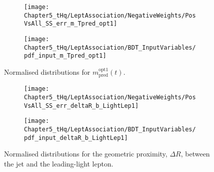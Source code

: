 \begin{comment}
\begin{figure}[h]
\centering
\begin{subfigure}{.46\textwidth}
  \centering
  \texttt{[image: Chapter5\_tHq/LeptAssociation/NegativeWeights/PosVsAll\_SS\_err\_deltaEta\_tau\_LightLep2\_fixed]}
\end{subfigure}%
\begin{subfigure}{.46\textwidth}
  \centering
  \texttt{[image: Chapter5\_tHq/LeptAssociation/BDT\_InputVariables/pdf\_input\_deltaEta\_tau\_LightLep2]}
\end{subfigure}
\caption{Normalised distributions for $\Delta \eta(\tauhad, \ell_{2})$.}
\label{fig:Appendix:BDTVARS:LeptonAssignment:deltaEta_tau_LightLep2}
\end{figure}
\end{comment}

\begin{figure}[h]
\centering
\begin{subfigure}{.46\textwidth}
  \centering
  \texttt{[image: Chapter5\_tHq/LeptAssociation/NegativeWeights/PosVsAll\_SS\_err\_m\_Tpred\_opt1]}
\end{subfigure}%
\begin{subfigure}{.46\textwidth}
  \centering
  \texttt{[image: Chapter5\_tHq/LeptAssociation/BDT\_InputVariables/pdf\_input\_m\_Tpred\_opt1]}
\end{subfigure}
\caption{Normalised distributions for $m^{\text{opt1}}_{\text{pred}}(t)$.}
\label{fig:Appendix:BDTVARS:LeptonAssignment:m_Tpred_opt1}
\end{figure}

\begin{figure}[h]
\centering
\begin{subfigure}{.46\textwidth}
  \centering
  \texttt{[image: Chapter5\_tHq/LeptAssociation/NegativeWeights/PosVsAll\_SS\_err\_deltaR\_b\_LightLep1]}
\end{subfigure}%
\begin{subfigure}{.46\textwidth}
  \centering
  \texttt{[image: Chapter5\_tHq/LeptAssociation/BDT\_InputVariables/pdf\_input\_deltaR\_b\_LightLep1]}
\end{subfigure}
\caption{Normalised distributions for the geometric proximity, $\Delta R$, between the \btagged jet and the leading-light lepton.}
\label{fig:Appendix:BDTVARS:LeptonAssignment:deltaR_b_LightLep1}
\end{figure}


